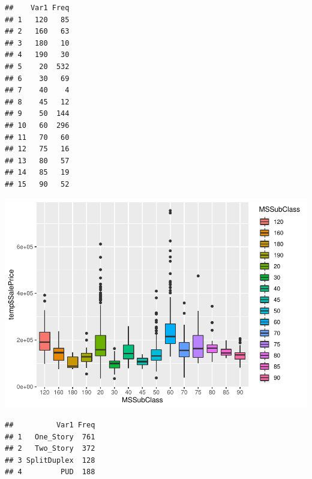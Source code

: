 \documentclass[]{article}
\newenvironment{Shaded}{\begin{snugshade}}{\end{snugshade}}
\newcommand{\KeywordTok}[1]{\textcolor[rgb]{0.13,0.29,0.53}{\textbf{#1}}}
\newcommand{\DataTypeTok}[1]{\textcolor[rgb]{0.13,0.29,0.53}{#1}}
\newcommand{\StringTok}[1]{\textcolor[rgb]{0.31,0.60,0.02}{#1}}
\newcommand{\CommentTok}[1]{\textcolor[rgb]{0.56,0.35,0.01}{\textit{#1}}}
\newcommand{\OperatorTok}[1]{\textcolor[rgb]{0.81,0.36,0.00}{\textbf{#1}}}
\newcommand{\NormalTok}[1]{#1}
\begin{document}
\begin{Shaded}
\end{Shaded}

\begin{verbatim}
##    Var1 Freq
## 1   120   85
## 2   160   63
## 3   180   10
## 4   190   30
## 5    20  532
## 6    30   69
## 7    40    4
## 8    45   12
## 9    50  144
## 10   60  296
## 11   70   60
## 12   75   16
## 13   80   57
## 14   85   19
## 15   90   52
\end{verbatim}

\includegraphics{EDA_files/figure-latex/unnamed-chunk-24-1.pdf}

\begin{verbatim}
##          Var1 Freq
## 1   One_Story  761
## 2   Two_Story  372
## 3 SplitDuplex  128
## 4         PUD  188
\end{verbatim}
\end{document}
